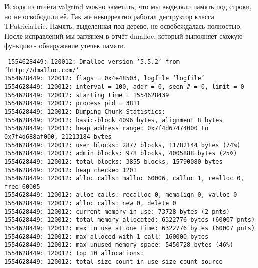 \documentclass[12pt]{article}
\begin{document}
Исходя из отчёта valgrind можно заметить, что мы выделяли память под строки, но не освободили её. Так же некорректно работал деструктор класса TPatriciaTrie. Память, выделенная под дерево, не освобождалась полностью. После исправлений мы заглянем в отчёт dmalloc, который выполняет схожую функцию - обнаружение утечек памяти.

{\texttt{
		1554628449: 120012: Dmalloc version '5.5.2' from 'http://dmalloc.com/'\\
		1554628449: 120012: flags = 0x4e48503, logfile 'logfile'\\
		1554628449: 120012: interval = 100, addr = 0, seen # = 0, limit = 0\\
		1554628449: 120012: starting time = 1554628439\\
		1554628449: 120012: process pid = 3811\\
		1554628449: 120012: Dumping Chunk Statistics:\\
		1554628449: 120012: basic-block 4096 bytes, alignment 8 bytes\\
		1554628449: 120012: heap address range: 0x7f4d67474000 to 0x7f4d688af000, 21213184 bytes\\
		1554628449: 120012:     user blocks: 2877 blocks, 11782144 bytes (74\%)\\
		1554628449: 120012:    admin blocks: 978 blocks, 4005888 bytes (25\%)\\
		1554628449: 120012:    total blocks: 3855 blocks, 15790080 bytes\\
		1554628449: 120012: heap checked 1201\\
		1554628449: 120012: alloc calls: malloc 60006, calloc 1, realloc 0, free 60005\\
		1554628449: 120012: alloc calls: recalloc 0, memalign 0, valloc 0\\
		1554628449: 120012: alloc calls: new 0, delete 0\\
		1554628449: 120012:   current memory in use: 73728 bytes (2 pnts)\\
		1554628449: 120012:  total memory allocated: 6322776 bytes (60007 pnts)\\
		1554628449: 120012:  max in use at one time: 6322776 bytes (60007 pnts)\\
		1554628449: 120012: max alloced with 1 call: 160000 bytes\\
		1554628449: 120012: max unused memory space: 5450728 bytes (46\%)\\
		1554628449: 120012: top 10 allocations:\\
		1554628449: 120012:  total-size  count in-use-size  count  source\\
}}
\end{document}
